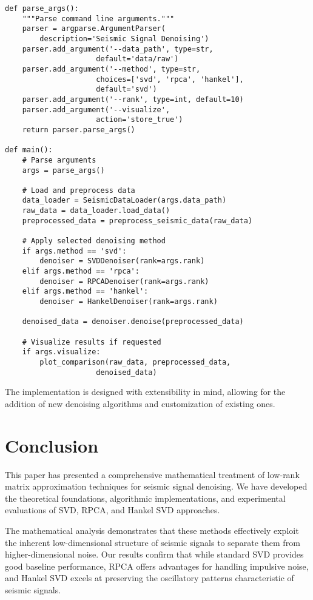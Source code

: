 \documentclass[10pt,twocolumn]{article}
\begin{document}
\begin{lstlisting}
def parse_args():
    """Parse command line arguments."""
    parser = argparse.ArgumentParser(
        description='Seismic Signal Denoising')
    parser.add_argument('--data_path', type=str, 
                     default='data/raw')
    parser.add_argument('--method', type=str, 
                     choices=['svd', 'rpca', 'hankel'], 
                     default='svd')
    parser.add_argument('--rank', type=int, default=10)
    parser.add_argument('--visualize', 
                     action='store_true')
    return parser.parse_args()

def main():
    # Parse arguments
    args = parse_args()
    
    # Load and preprocess data
    data_loader = SeismicDataLoader(args.data_path)
    raw_data = data_loader.load_data()
    preprocessed_data = preprocess_seismic_data(raw_data)
    
    # Apply selected denoising method
    if args.method == 'svd':
        denoiser = SVDDenoiser(rank=args.rank)
    elif args.method == 'rpca':
        denoiser = RPCADenoiser(rank=args.rank)
    elif args.method == 'hankel':
        denoiser = HankelDenoiser(rank=args.rank)
    
    denoised_data = denoiser.denoise(preprocessed_data)
    
    # Visualize results if requested
    if args.visualize:
        plot_comparison(raw_data, preprocessed_data, 
                     denoised_data)
\end{lstlisting}

The implementation is designed with extensibility in mind, allowing for the addition of new denoising algorithms and customization of existing ones.

\section{Conclusion}
This paper has presented a comprehensive mathematical treatment of low-rank matrix approximation techniques for seismic signal denoising. We have developed the theoretical foundations, algorithmic implementations, and experimental evaluations of SVD, RPCA, and Hankel SVD approaches.

The mathematical analysis demonstrates that these methods effectively exploit the inherent low-dimensional structure of seismic signals to separate them from higher-dimensional noise. Our results confirm that while standard SVD provides good baseline performance, RPCA offers advantages for handling impulsive noise, and Hankel SVD excels at preserving the oscillatory patterns characteristic of seismic signals.
\end{document}
